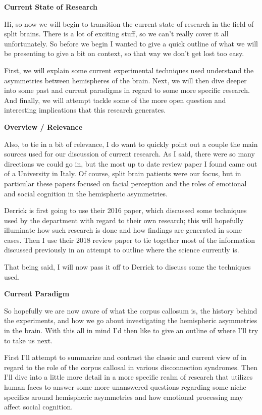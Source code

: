 \documentclass[basic]{inVerba-notes}
\begin{document}
    
\textbf{Current State of Research}

Hi, so now we will begin to transition the current state of research in the field of split brains. There is a lot of exciting stuff, so we can't really cover it all unfortunately. So before we begin I wanted to give a quick outline of what we will be presenting to give a bit on context, so that way we don't get lost too easy. 

First, we will explain some current experimental techniques used understand the asymmetries between hemispheres of the brain. Next, we will then dive deeper into some past and current paradigms in regard to some more specific research. And finally, we will attempt tackle some of the more open question and interesting implications that this research generates.

\textbf{Overview / Relevance}
 
Also, to tie in a bit of relevance, I do want to quickly point out a couple the main sources used for our discussion of current research. As I said, there were so many directions we could go in, but the most up to date review paper I found came out of a University in Italy. Of course, split brain patients were our focus, but in particular these papers focused on facial perception and the roles of emotional and social cognition in the hemispheric asymmetries.

Derrick is first going to use their 2016 paper, which discussed some techniques used by the department with regard to their own research; this will hopefully illuminate how such research is done and how findings are generated in some cases. Then I use their 2018 review paper to tie together most of the information discussed previously in an attempt to outline where the science currently is. 

That being said, I will now pass it off to Derrick to discuss some the techniques used.

\textbf{Current Paradigm}

So hopefully we are now aware of what the corpus callosum is, the history behind the experiments, and how we go about investigating the hemispheric asymmetries in the brain. With this all in mind I'd then like to give an outline of where I'll try to take us next.

First I'll attempt to summarize and contrast the classic and current view of in regard to the role of the corpus callosal in various disconnection syndromes. Then I'll dive into a little more detail in a more specific realm of research that utilizes human faces to answer some more unanswered questions regarding some niche specifics around hemispheric asymmetries and how emotional processing may affect social cognition.
\end{document}
